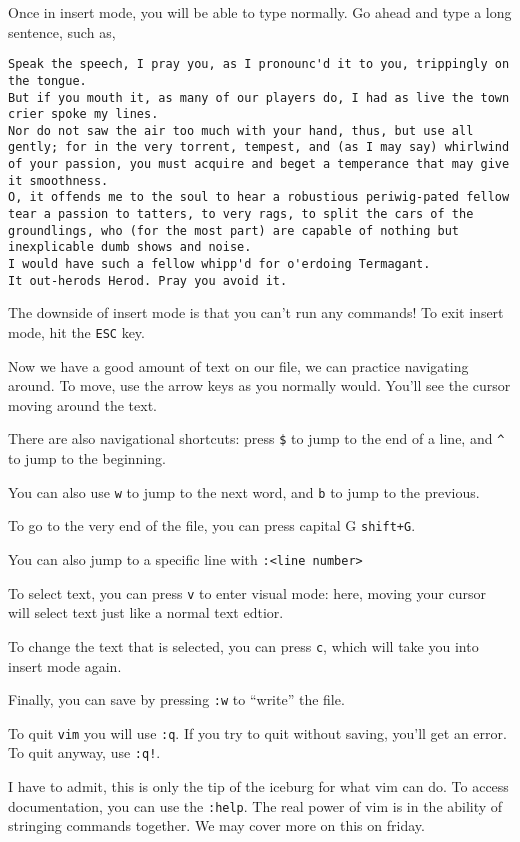 \documentclass[aps,showpacs,prd,notitlepage,preprintnumbers,amsmath,amssymb,letterpaper]{revtex4}
\begin{document}
Once in insert mode, you will be able to type normally. Go ahead and type a long sentence, such as,

\begin{verbatim}
Speak the speech, I pray you, as I pronounc'd it to you, trippingly on the tongue.
But if you mouth it, as many of our players do, I had as live the town crier spoke my lines.
Nor do not saw the air too much with your hand, thus, but use all gently; for in the very torrent, tempest, and (as I may say) whirlwind of your passion, you must acquire and beget a temperance that may give it smoothness.
O, it offends me to the soul to hear a robustious periwig-pated fellow tear a passion to tatters, to very rags, to split the cars of the groundlings, who (for the most part) are capable of nothing but inexplicable dumb shows and noise.
I would have such a fellow whipp'd for o'erdoing Termagant.
It out-herods Herod. Pray you avoid it.
\end{verbatim}

The downside of insert mode is that you can't run any commands!
To exit insert mode, hit the \verb|ESC| key.

Now we have a good amount of text on our file, we can practice navigating around.
To move, use the arrow keys as you normally would. You'll see the cursor moving around the text.

There are also navigational shortcuts: press \verb|$| to jump to the end of a line, and \verb|^| to jump to the beginning.

You can also use \verb|w| to jump to the next word, and \verb|b| to jump to the previous.

To go to the very end of the file, you can press capital G \verb|shift+G|.

You can also jump to a specific line with \verb|:<line number>|

To select text, you can press \verb|v| to enter visual mode: here, moving your cursor will select text just like a normal text edtior.

To change the text that is selected, you can press \verb|c|, which will take you into insert mode again.

Finally, you can save by pressing \verb|:w| to ``write'' the file.

To quit \verb|vim| you will use \verb|:q|. If you try to quit without saving, you'll get an error. To quit anyway, use \verb|:q!|.

I have to admit, this is only the tip of the iceburg for what vim can do. To access documentation, you can use the \verb|:help|.
The real power of vim is in the ability of stringing commands together. We may cover more on this on friday.
\end{document}
